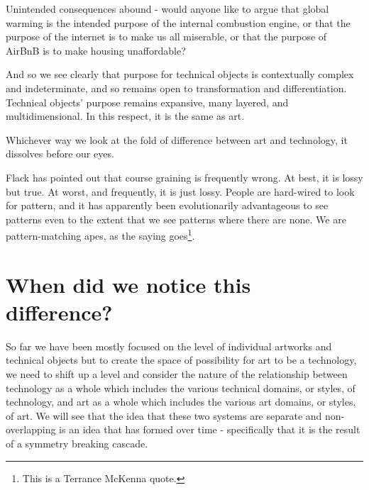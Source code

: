 \documentclass[letterpaper]{article}
\begin{document}
    Unintended consequences abound - would anyone like to argue that global warming is the intended purpose of the internal combustion engine, or that the purpose of the internet is to make us all miserable, or that the purpose of AirBnB is to make housing unaffordable?

    And so we see clearly that purpose for technical objects is contextually complex and indeterminate, and so remains open to transformation and differentiation. Technical objects' purpose remains expansive, many layered, and multidimensional. In this respect, it is the same as art.

    Whichever way we look at the fold of difference between art and technology, it dissolves before our eyes.
    
    Flack has pointed out that course graining is frequently wrong. At best, it is lossy but true. At worst, and frequently, it is just lossy. People are hard-wired to look for pattern, and it has apparently been evolutionarily advantageous to see patterns even to the extent that we see patterns where there are none. We are pattern-matching apes, as the saying goes\footnote{
        This is a Terrance McKenna quote.
    }.

\section{When did we notice this difference?}
    
    So far we have been mostly focused on the level of individual artworks and technical objects but to create the space of possibility for art to be a technology, we need to shift up a level and consider the nature of the relationship between technology as a whole which includes the various technical domains, or styles, of technology, and art as a whole which includes the various art domains, or styles, of art. We will see that the idea that these two systems are separate and non-overlapping is an idea that has formed over time - specifically that it is the result of a symmetry breaking cascade.
\end{document}
